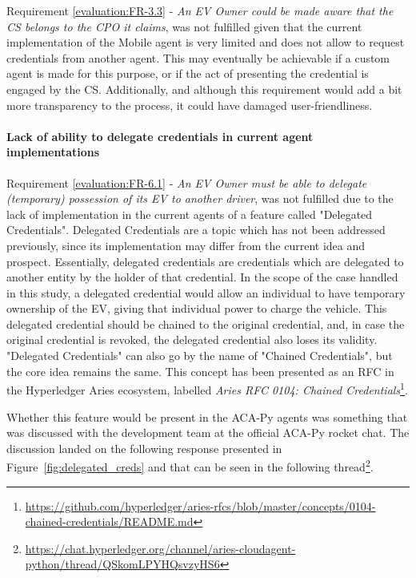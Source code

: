 Requirement \ref{evaluation:FR-3.3} - \textit{An EV Owner could be made aware that the CS belongs to the CPO it claims}, was not fulfilled given that the current implementation of the Mobile agent is very limited and does not allow to request credentials from another agent. This may eventually be achievable if a custom agent is made for this purpose, or if the act of presenting the credential is engaged by the CS. Additionally, and although this requirement would add a bit more transparency to the process, it could have damaged user-friendliness.

\paragraph{Lack of ability to delegate credentials in current agent implementations}

Requirement \ref{evaluation:FR-6.1} - \textit{An EV Owner must be able to delegate (temporary) possession of its EV to another driver}, was not fulfilled due to the lack of implementation in the current agents of a feature called "Delegated Credentials". Delegated Credentials are a topic which has not been addressed previously, since its implementation may differ from the current idea and prospect. Essentially, delegated credentials are credentials which are delegated to another entity by the holder of that credential. In the scope of the case handled in this study, a delegated credential would allow an individual to have temporary ownership of the EV, giving that individual power to charge the vehicle. This delegated credential should be chained to the original credential, and, in case the original credential is revoked, the delegated credential also loses its validity. "Delegated Credentials" can also go by the name of "Chained Credentials", but the core idea remains the same. This concept has been presented as an RFC in the Hyperledger Aries ecosystem, labelled \textit{Aries RFC 0104: Chained Credentials}\footnote{\url{https://github.com/hyperledger/aries-rfcs/blob/master/concepts/0104-chained-credentials/README.md}}.

Whether this feature would be present in the ACA-Py agents was something that was discussed with the development team at the official ACA-Py rocket chat. The discussion landed on the following response presented in Figure~\ref{fig:delegated_creds} and that can be seen in the following thread\footnote{\url{https://chat.hyperledger.org/channel/aries-cloudagent-python/thread/QSkomLPYHQsvzyHS6}}.

